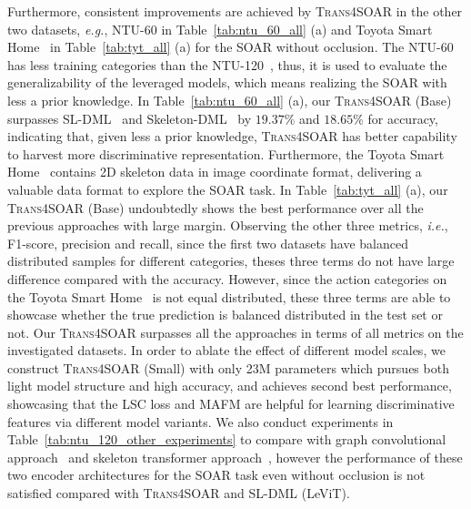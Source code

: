\documentclass[lettersize,journal]{IEEEtran}
\begin{document}
Furthermore, consistent improvements are achieved by \textsc{Trans4SOAR} in the other two datasets, \textit{e.g.}, NTU-60 in Table~\ref{tab:ntu_60_all} (a) and Toyota Smart Home~\cite{Das_2019_ICCV} in Table~\ref{tab:tyt_all} (a) for the SOAR without occlusion.
The NTU-60~\cite{shahroudy2016ntu} has less training categories than the NTU-120~\cite{liu2019ntu}, thus, it is used to evaluate the generalizability of the leveraged models, which means realizing the SOAR with less a prior knowledge.
In Table~\ref{tab:ntu_60_all} (a), our \textsc{Trans4SOAR} (Base) surpasses SL-DML~\cite{memmesheimer2021sl} and Skeleton-DML~\cite{memmesheimer2020skeleton_dml} by $19.37\%$ and $18.65\%$ for accuracy, indicating that, given less a prior knowledge, \textsc{Trans4SOAR} has better capability to harvest more discriminative representation. 
Furthermore, the Toyota Smart Home~\cite{Das_2019_ICCV} contains 2D skeleton data in image coordinate format, delivering a valuable data format to explore the SOAR task.
In Table~\ref{tab:tyt_all} (a), our \textsc{Trans4SOAR} (Base) undoubtedly shows the best performance over all the previous approaches with large margin.
Observing the other three metrics, \textit{i.e.}, F1-score, precision and recall, since the first two datasets have balanced distributed samples for different categories, theses three terms do not have large difference compared with the accuracy. However, since the action categories on the Toyota Smart Home~\cite{Das_2019_ICCV} is not equal distributed, these three terms are able to showcase whether the true prediction is balanced distributed in the test set or not.
Our \textsc{Trans4SOAR} surpasses all the approaches in terms of all metrics on the investigated datasets.
In order to ablate the effect of different model scales, we construct \textsc{Trans4SOAR} (Small) with only 23M parameters which pursues both light model structure and high accuracy, and achieves second best performance, showcasing that the LSC loss and MAFM are helpful for learning discriminative features via different model variants.
We also conduct experiments in Table~\ref{tab:ntu_120_other_experiments} to compare with graph convolutional approach~\cite{chen2021channel} and skeleton transformer approach~\cite{plizzari2021skeleton}, however the performance of these two encoder architectures for the SOAR task even without occlusion is not satisfied compared with \textsc{Trans4SOAR} and SL-DML (LeViT). 
\end{document}
